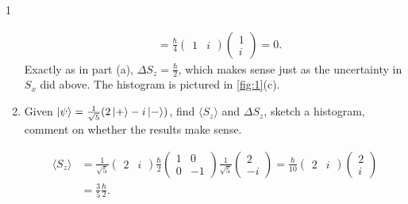\documentclass[11pt]{article}
\begin{document}
\begin{problem}{1}
\begin{enumerate}[label=(\alph*)]
\begin{answer}
\begin{equation}
\begin{aligned}
            &= \frac{\hbar}{4} \begin{pmatrix}
1  & i
 \end{pmatrix} \begin{pmatrix}
1 \\
i
 \end{pmatrix} = 0.
          \end{aligned}
        \end{equation}
        Exactly as in part (a), \(\Delta S_z = \frac{\hbar}{2}\), which makes sense just as the uncertainty in \(S_x\) did above.
        The histogram is pictured in \cref{fig:1}(c).
        \end{answer}
  \item Given \( \ket{\psi} = \frac{1}{\sqrt{5}}(2\ket{+} - i\ket{-}) \), find \( \langle S_z \rangle \) and \( \Delta S_{z} \), sketch a histogram, comment on whether the results make sense.
        \begin{answer}
          \begin{equation}
          \label{eq:6}
          \begin{aligned}
            \langle S_z \rangle &=
            \frac{1}{\sqrt{5}} \begin{pmatrix}
              2 & i
 \end{pmatrix}
          \frac{\hbar}{2}  \begin{pmatrix}
1  & 0 \\
0  & -1
 \end{pmatrix} \frac{1}{\sqrt{5}} \begin{pmatrix}
2 \\
-i
 \end{pmatrix} = \frac{\hbar}{10} \begin{pmatrix}
2  & i
 \end{pmatrix} \begin{pmatrix}
2 \\
i
 \end{pmatrix} \\
            &= \frac{3}{5} \frac{\hbar}{2}.
          \end{aligned}
          \end{equation}


\end{answer}
\end{enumerate}
\end{problem}
\end{document}
